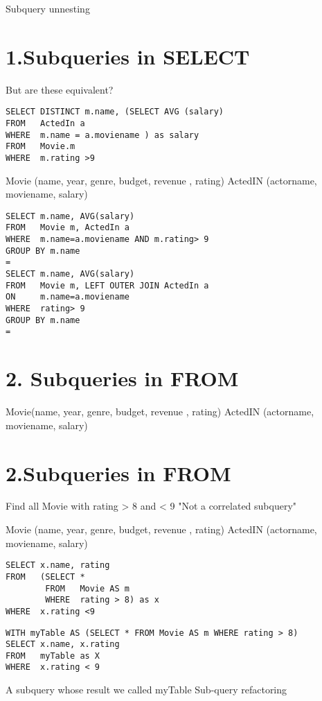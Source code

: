 \documentclass{article}
\begin{document}
Subquery unnesting

\section*{1.Subqueries in SELECT}

But are these equivalent?

\begin{verbatim}
SELECT DISTINCT m.name, (SELECT AVG (salary)
FROM   ActedIn a
WHERE  m.name = a.moviename ) as salary
FROM   Movie.m
WHERE  m.rating >9
\end{verbatim}

Movie (name, year, genre, budget, revenue , rating) ActedIN (actorname, moviename, salary)

\begin{verbatim}
SELECT m.name, AVG(salary)
FROM   Movie m, ActedIn a
WHERE  m.name=a.moviename AND m.rating> 9
GROUP BY m.name
=
SELECT m.name, AVG(salary)
FROM   Movie m, LEFT OUTER JOIN ActedIn a
ON     m.name=a.moviename
WHERE  rating> 9
GROUP BY m.name
=
\end{verbatim}

\section*{2. Subqueries in FROM}

Movie(name, year, genre, budget, revenue , rating) ActedIN (actorname, moviename, salary)

\section*{2.Subqueries in FROM}

Find all Movie with rating > 8 and < 9 "Not a correlated subquery"

Movie (name, year, genre, budget, revenue , rating) ActedIN (actorname, moviename, salary)

\begin{verbatim}
SELECT x.name, rating
FROM   (SELECT *
        FROM   Movie AS m
        WHERE  rating > 8) as x
WHERE  x.rating <9
\end{verbatim}

\begin{verbatim}
WITH myTable AS (SELECT * FROM Movie AS m WHERE rating > 8)
SELECT x.name, x.rating
FROM   myTable as X
WHERE  x.rating < 9
\end{verbatim}

A subquery whose result we called myTable Sub-query refactoring
\end{document}
